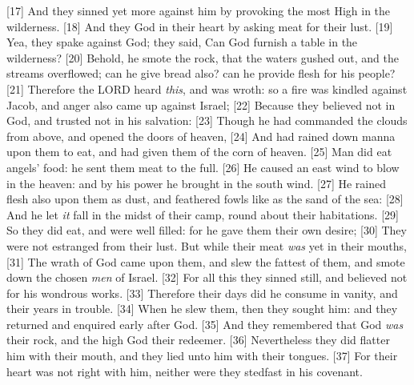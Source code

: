 [17] \textcolor[cmyk]{0.99998,1,0,0}{And they sinned yet more against him by provoking the most High in the wilderness.}
[18] \textcolor[cmyk]{0.99998,1,0,0}{And they  God in their heart by asking meat for their lust.}
[19] \textcolor[cmyk]{0.99998,1,0,0}{Yea, they spake against God; they said, Can God furnish a table in the wilderness?}
[20] \textcolor[cmyk]{0.99998,1,0,0}{Behold, he smote the rock, that the waters gushed out, and the streams overflowed; can he give bread also? can he provide flesh for his people?}
[21] \textcolor[cmyk]{0.99998,1,0,0}{Therefore the LORD heard \emph{this}, and was wroth: so a fire was kindled against Jacob, and anger also came up against Israel;}
[22] \textcolor[cmyk]{0.99998,1,0,0}{Because they believed not in God, and trusted not in his salvation:}
[23] \textcolor[cmyk]{0.99998,1,0,0}{Though he had commanded the clouds from above, and opened the doors of heaven,}
[24] \textcolor[cmyk]{0.99998,1,0,0}{And had rained down manna upon them to eat, and had given them of the corn of heaven.}
[25] \textcolor[cmyk]{0.99998,1,0,0}{Man did eat angels' food: he sent them meat to the full.}
[26] \textcolor[cmyk]{0.99998,1,0,0}{He caused an east wind to blow in the heaven: and by his power he brought in the south wind.}
[27] \textcolor[cmyk]{0.99998,1,0,0}{He rained flesh also upon them as dust, and feathered fowls like as the sand of the sea:}
[28] \textcolor[cmyk]{0.99998,1,0,0}{And he let \emph{it} fall in the midst of their camp, round about their habitations.}
[29] \textcolor[cmyk]{0.99998,1,0,0}{So they did eat, and were well filled: for he gave them their own desire;}
[30] \textcolor[cmyk]{0.99998,1,0,0}{They were not estranged from their lust. But while their meat \emph{was} yet in their mouths,}
[31] \textcolor[cmyk]{0.99998,1,0,0}{The wrath of God came upon them, and slew the fattest of them, and smote down the chosen \emph{men} of Israel.}
[32] \textcolor[cmyk]{0.99998,1,0,0}{For all this they sinned still, and believed not for his wondrous works.}
[33] \textcolor[cmyk]{0.99998,1,0,0}{Therefore their days did he consume in vanity, and their years in trouble.}
[34] \textcolor[cmyk]{0.99998,1,0,0}{When he slew them, then they sought him: and they returned and enquired early after God.}
[35] \textcolor[cmyk]{0.99998,1,0,0}{And they remembered that God \emph{was} their rock, and the high God their redeemer.}
[36] \textcolor[cmyk]{0.99998,1,0,0}{Nevertheless they did flatter him with their mouth, and they lied unto him with their tongues.}
[37] \textcolor[cmyk]{0.99998,1,0,0}{For their heart was not right with him, neither were they stedfast in his covenant.}

